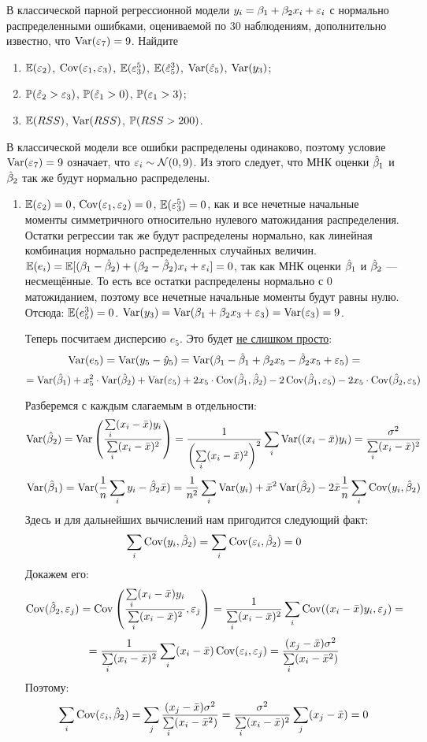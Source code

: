 \begin{problem}
В классической парной регрессионной модели $y_i = \beta_1 + \beta_2 x_i + \e_i$ с нормально распределенными ошибками, оцениваемой по 30 наблюдениям, дополнительно известно, что $\Var(\e_7)=9$. Найдите
\begin{enumerate}
\item $\E(\e_2)$, $\Cov(\e_1,\e_3)$, $\E(\e_3^5)$, $\E(\he_5^3)$, $\Var(\he_5)$, $\Var(y_3)$;
\item $\P(\he_2>\e_3)$, $\P(\he_1>0)$, $\P(\e_1>3)$;
\item $\E(RSS)$, $\Var(RSS)$, $\P(RSS>200)$.
\end{enumerate}


\begin{sol}
В классической модели все ошибки распределены одинаково, поэтому условие $\Var(\e_7) = 9$ означает, что $\e_i \sim \cN(0, 9)$. Из этого следует, что МНК оценки $\hb_1$ и $\hb_2$ так же будут нормально распределены.

\begin{enumerate}
\item $\E(\e_2) = 0$, $\Cov(\e_1, \e_2) = 0$, $\E(\e_3^5) = 0$, как и все нечетные начальные моменты симметричного относительно нулевого матожидания распределения. Остатки регрессии так же будут распределены нормально, как линейная комбинация нормально распределенных случайных величин. $\E(e_i) = \E[(\beta_1-\hb_2) + (\beta_2-\hb_2)x_i + \e_i] = 0$, так как МНК оценки $\hb_1$ и $\hb_2$ — несмещённые. То есть все остатки распределены нормально с 0 матожиданием, поэтому все нечетные начальные моменты будут равны нулю. Отсюда: $\E(e_5^3) = 0$. $\Var(y_3) = \Var(\beta_1 + \beta_2x_3 + \e_3) = \Var(\e_3) = 9$.

Теперь посчитаем дисперсию $e_5$. Это будет \underline{не слишком просто}:
\[
\Var(e_5) = \Var(y_5-\hy_5) = \Var(\beta_1-\hb_1 + \beta_2x_5-\hb_2x_5 + \e_5) =
\]
\[
= \Var(\hb_1) + x_5^2\cdot\Var(\hb_2) + \Var(\e_5) + 2x_5\cdot\Cov(\hb_1, \hb_2) - 2\Cov(\hb_1, \e_5) - 2x_5\cdot\Cov(\hb_2, \e_5)
\]

Разберемся с каждым слагаемым в отдельности:
\[
\Var(\hb_2) = \Var\left(\frac{\sum\limits_i(x_i-\bar{x})y_i}{\sum\limits_i(x_i-\bar{x})^2}\right) = \frac{1}{\left(\sum\limits_i(x_i-\bar{x})^2\right)^2}\sum\limits_i\Var((x_i-\bar{x})y_i) = \frac{\sigma^2}{\sum\limits_i(x_i-\bar{x})^2}
\]
\[
\Var(\hb_1) = \Var(\frac{1}{n}\sum\limits_iy_i - \hb_2\bar{x}) = \frac{1}{n^2}\sum\limits_i\Var(y_i)  + \bar{x}^2\Var(\hb_2) - 2\bar{x}\frac{1}{n}\sum\limits_i\Cov(y_i, \hb_2)
\]
Здесь и для дальнейших вычислений нам пригодится следующий факт:
\[
\sum\limits_i\Cov(y_i, \hb_2) = \sum\limits_i\Cov(\e_i, \hb_2)  = 0
\]
Докажем его:
\[
\Cov(\hb_2, \e_j) = \Cov\left(\frac{\sum\limits_i(x_i-\bar{x})y_i}{\sum\limits_i(x_i-\bar{x})^2}, \e_j\right) = \frac{1}{\sum\limits_i(x_i-\bar{x})^2}\sum\limits_i\Cov((x_i-\bar{x})y_i, \e_j) =
\]
\[
= \frac{1}{\sum\limits_i(x_i-\bar{x})^2} \sum\limits_i(x_i-\bar{x})\Cov(\e_i, \e_j) = \frac{(x_j - \bar{x})\sigma^2}{\sum\limits_i(x_i-\bar{x}^2)}
\]
Поэтому:
\[
\sum\limits_i\Cov(\e_i, \hb_2) = \sum\limits_j \frac{(x_j-\bar{x})\sigma^2}{\sum\limits_i(x_i-\bar{x}^2)} = \frac{\sigma^2}{\sum\limits_i(x_i-\bar{x})^2} \sum\limits_j(x_j - \bar{x}) = 0
\]


\end{enumerate}
\end{sol}
\end{problem}
